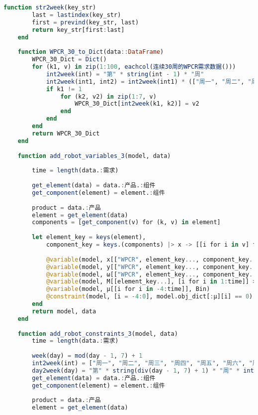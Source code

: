 \begin{appendices}
\begin{lstlisting}[language=julia]
    function str2week(key_str)
        last = lastindex(key_str)
        first = prevind(key_str, last)
        return key_str[first:last]
    end
    
    function WPCR_30_to_Dict(data::DataFrame)
        WPCR_30_Dict = Dict()
        for (k1, v) in zip(1:100, eachcol(连续30周的WPCR需求数据()))
            int2week(int) = "第" * string(int - 1) * "周"
            int2week(int1, int2) = int2week(int1) * (["周一", "周二", "周三", "周四", "周五", "周六", "周日"][int2])
            if k1 != 1
                for (k2, v2) in zip(1:7, v)
                    WPCR_30_Dict[int2week(k1, k2)] = v2
                end
            end
        end
        return WPCR_30_Dict
    end
    
    function add_robot_variables_3(model, data)
    
        time = length(data.:需求)
    
        get_element(data) = data.:产品.:组件
        get_component(element) = element.:组件
    
        product = data.:产品
        element = get_element(data)
        components = [get_component(v) for (k, v) in element]
    
        let element_key = keys(element),
            component_key = keys.(components) |> x -> [[i for i in v] for v in x] |> x -> vcat(x...)
    
            @variable(model, x[["WPCR", element_key..., component_key...], [i for i in 1:time]] >= 0, Int)
            @variable(model, y[["WPCR", element_key..., component_key...], [i for i in 1:time]] >= 0, Int)
            @variable(model, ω[["WPCR", element_key..., component_key...], [i for i in 1:time]], Bin)
            @variable(model, M[[element_key...], [i for i in 1:time]] >= 0, Int)
            @variable(model, μ[[i for i in -4:time]], Bin)
            @constraint(model, [i = -4:0], model.obj_dict[:μ][i] == 0)
        end
        return model, data
    end
    
    function add_robot_constraints_3(model, data)
        time = length(data.:需求)
    
        week(day) = mod(day - 1, 7) + 1
        int2week(int) = ["周一", "周二", "周三", "周四", "周五", "周六", "周日"][week(int)]
        day2week(day) = "第" * string(div(day - 1, 7) + 1) * "周" * int2week(day)
        get_element(data) = data.:产品.:组件
        get_component(element) = element.:组件
    
        product = data.:产品
        element = get_element(data)
    

\end{lstlisting}
\end{appendices}
